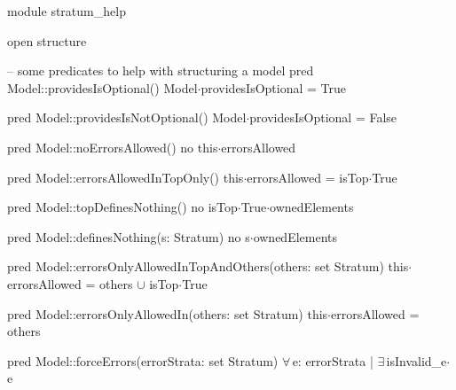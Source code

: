 module stratum_help

open structure


-- some predicates to help with structuring a model
pred Model::providesIsOptional()
{
  Model$\cdot$providesIsOptional = True
}

pred Model::providesIsNotOptional()
{
  Model$\cdot$providesIsOptional = False
}

pred Model::noErrorsAllowed()
{
  no this$\cdot$errorsAllowed
}

pred Model::errorsAllowedInTopOnly()
{
  this$\cdot$errorsAllowed = isTop$\cdot$True
}

pred Model::topDefinesNothing()
{
  no isTop$\cdot$True$\cdot$ownedElements
}

pred Model::definesNothing(s: Stratum)
{
  no s$\cdot$ownedElements
}

pred Model::errorsOnlyAllowedInTopAndOthers(others: set Stratum)
{
  this$\cdot$errorsAllowed = others $\cup$ isTop$\cdot$True
}

pred Model::errorsOnlyAllowedIn(others: set Stratum)
{
  this$\cdot$errorsAllowed = others
}

pred Model::forceErrors(errorStrata: set Stratum)
{
  $\forall\,$e: errorStrata |
    $\exists\,$isInvalid_e$\cdot$e
}
